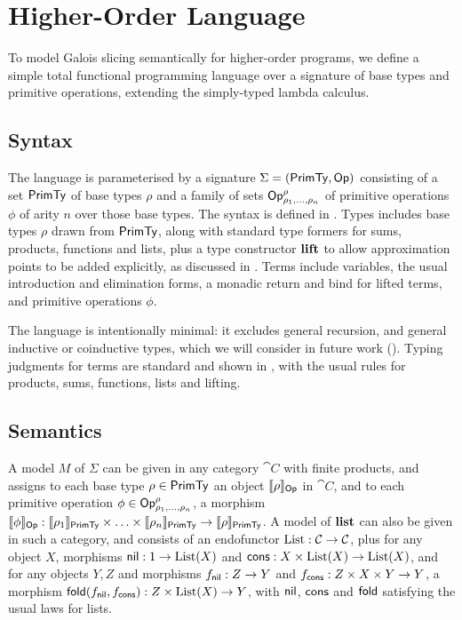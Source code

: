 \section{Higher-Order Language}
\label{sec:language}

To model Galois slicing semantically for higher-order programs, we define a simple total functional
programming language over a signature of base types and primitive operations, extending the simply-typed
lambda calculus.

\subsection{Syntax}
\label{sec:language:syntax}

The language is parameterised by a signature $\Sigma = (\mathsf{PrimTy}, \mathsf{Op})$ consisting of a set $\mathsf{PrimTy}$ of
base types $\rho$ and a family of sets $\mathsf{Op}^\rho_{\rho_1,\ldots,\rho_n}$ of primitive operations $\phi$ of
arity $n$ over those base types. The syntax is defined in . Types includes base types $\rho$
drawn from $\mathsf{PrimTy}$, along with standard type formers for sums, products, functions and lists, plus a type
constructor $\mathbf{lift}$ to allow approximation points to be added explicitly, as discussed in
. Terms include variables, the usual introduction and elimination forms, a monadic
return and bind for lifted terms, and primitive operations $\phi$.

The language is intentionally minimal: it excludes general recursion, and general inductive or coinductive
types, which we will consider in future work (). Typing judgments for terms are standard
and shown in , with the usual rules for products, sums, functions, lists and lifting.




\subsection{Semantics}
\label{sec:language:semantics}



A model $M$ of $\Sigma$ can be given in any category $\cat{C}$ with finite products, and assigns to each base
type $\rho \in \mathsf{PrimTy}$ an object $\llbracket \rho \rrbracket_{\mathsf{Op}}$ in $\cat{C}$, and to each primitive operation $\phi
\in \mathsf{Op}^\rho_{\rho_1,\ldots,\rho_n}$, a morphism $\llbracket \phi \rrbracket_{\mathsf{Op}}: \llbracket \rho_1 \rrbracket_{\mathsf{PrimTy}} \times \ldots
\times \llbracket \rho_n \rrbracket_{\mathsf{PrimTy}} \to \llbracket \rho \rrbracket_{\mathsf{PrimTy}}$. A model of $\mathbf{list}$ can also be given in such a
category, and consists of an endofunctor $\mathrm{List}: \mathcal{C} \to \mathcal{C}$, plus for any object $X$, morphisms
$\mathsf{nil}: 1 \to \mathrm{List}(X)$ and $\mathsf{cons}: X \times \mathrm{List}(X) \to \mathrm{List}(X)$, and for any objects $Y, Z$ and morphisms
$f_{\mathsf{nil}}: Z \to Y$ and $f_{\mathsf{cons}}: Z \times X \times Y \to Y$, a morphism $\mathsf{fold}(f_{\mathsf{nil}},f_{\mathsf{cons}}): Z \times
\mathrm{List}(X) \to Y$, with $\mathsf{nil}$, $\mathsf{cons}$ and $\mathsf{fold}$ satisfying the usual laws for lists.

